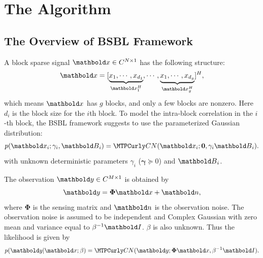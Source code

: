 \chapter{The Algorithm}
%
\section{The Overview of BSBL Framework}
A block sparse signal $\ve{x}\in\mathbb{C}^{N\times1}$ has the following structure:
\begin{equation}
\ve{x} = [\underbrace{x_1,\cdots,x_{d_1}}_{\ve{x}_1^H},\cdots,
\underbrace{x_1,\cdots,x_{d_g}}_{\ve{x}_g^H}]^H,
\end{equation}
which means $\ve{x}$ has $g$ blocks, and only a few blocks are nonzero. Here $d_i$ is the block size for the $i$th block. To model the intra-block correlation in the $i$-th block, the BSBL framework suggests to use the parameterized Gaussian distribution:
\begin{equation}\label{eq:x_model}
p(\ve{x}_i;{\gamma_i},\ve{B}_i) =
\mathcal{CN}(\ve{x}_i;\mathbf{0},{\gamma_i}\ve{B}_i). 
\end{equation}
with unknown deterministic parameters $\gamma_i$ ($\bm{\gamma}\succeq0$) and $\ve{B}_i$. 

The observation $\ve{y}\in\mathbb{C}^{M\times1}$ is obtained by
\begin{equation}
\ve{y} = \bm{\Phi}\ve{x} + \ve{n},
\end{equation}
where $\bm{\Phi}$ is the sensing matrix and $\ve{n}$ is the observation noise.
The observation noise is assumed to be independent and Complex Gaussian with zero 
mean and variance equal to $\beta^{-1}\ve{I}$. $\beta$ is also unknown. Thus the likelihood is given by
\begin{equation}\label{eq:y_model}
p(\ve{y}|\ve{x};\beta) = \mathcal{CN}(\ve{y};\bm{\Phi}\ve{x},\beta^{-1}\ve{I}). 
\end{equation}

